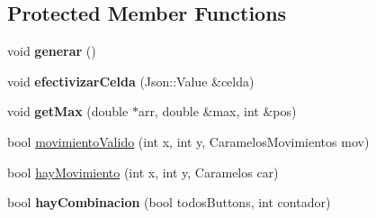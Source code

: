 \subsection*{Protected Member Functions}
\begin{DoxyCompactItemize}
\item 
\hypertarget{classTablero_a9b915b975e34d4f466a2de5cfb491d21}{void {\bfseries generar} ()}\label{classTablero_a9b915b975e34d4f466a2de5cfb491d21}

\item 
\hypertarget{classTablero_a53a6ad1bfe2ba24468760795cc2486a2}{void {\bfseries efectivizar\-Celda} (Json\-::\-Value \&celda)}\label{classTablero_a53a6ad1bfe2ba24468760795cc2486a2}

\item 
\hypertarget{classTablero_acbba660d044fff4072b210c3eff39735}{void {\bfseries get\-Max} (double $\ast$arr, double \&max, int \&pos)}\label{classTablero_acbba660d044fff4072b210c3eff39735}

\item 
bool \hyperlink{classTablero_a955a764e71cc33dde7d61bb98b164a34}{movimiento\-Valido} (int x, int y, Caramelos\-Movimientos mov)
\item 
bool \hyperlink{classTablero_adfbac5dfd3d3b7454997be676421980b}{hay\-Movimiento} (int x, int y, Caramelos car)
\item 
\hypertarget{classTablero_ac6821558f870cf4fc48a987a63da8446}{bool {\bfseries hay\-Combinacion} (bool todos\-Buttons, int contador)}\label{classTablero_ac6821558f870cf4fc48a987a63da8446}


\end{DoxyCompactItemize}
